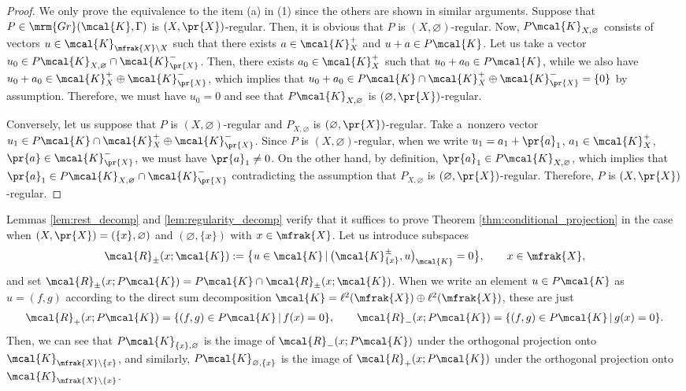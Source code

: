 \begin{proof}
We only prove the equivalence to the item (a) in (1) since the others are shown in similar arguments.
Suppose that $P\in \mrm{Gr}(\mcal{K},\Gamma)$ is $(X,\pr{X})$-regular. Then, it is obvious that $P$ is $(X,\varnothing)$-regular. Now, $P\mcal{K}_{X,\varnothing}$ consists of vectors $u\in\mcal{K}_{\mfrak{X}\backslash X}$ such that there exists $a\in \mcal{K}_{X}^{+}$ and $u+a\in P\mcal{K}$. Let us take a vector $u_{0}\in P\mcal{K}_{X,\varnothing}\cap \mcal{K}_{\pr{X}}^{-}$. Then, there exists $a_{0}\in \mcal{K}_{X}^{+}$ such that $u_{0}+a_{0}\in P\mcal{K}$, while we also have $u_{0}+a_{0}\in \mcal{K}_{X}^{+}\oplus \mcal{K}_{\pr{X}}^{-}$, which implies that $u_{0}+a_{0}\in P\mcal{K}\cap \mcal{K}_{X}^{+}\oplus \mcal{K}_{\pr{X}}^{-}=\{0\}$ by assumption. Therefore, we must have $u_{0}=0$ and see that $P\mcal{K}_{X,\varnothing}$ is $(\varnothing,\pr{X})$-regular.

Conversely, let us suppose that $P$ is $(X,\varnothing)$-regular and $P_{X,\varnothing}$ is $(\varnothing,\pr{X})$-regular. Take a~nonzero vector $u_{1}\in P\mcal{K}\cap \mcal{K}_{X}^{+}\oplus \mcal{K}_{\pr{X}}^{-}$. Since $P$ is $(X,\varnothing)$-regular, when we write $u_{1}=a_{1}+\pr{a}_{1}$, $a_{1}\in \mcal{K}_{X}^{+}$, $\pr{a}\in \mcal{K}_{\pr{X}}^{-}$, we must have $\pr{a}_{1}\neq 0$. On the other hand, by definition, $\pr{a}_{1}\in P\mcal{K}_{X,\varnothing}$, which implies that $\pr{a}_{1}\in P\mcal{K}_{X,\varnothing}\cap \mcal{K}_{\pr{X}}^{-}$ contradicting the assumption that $P_{X,\varnothing}$ is $(\varnothing,\pr{X})$-regular. Therefore, $P$ is $(X,\pr{X})$-regular.
\end{proof}

Lemmas \ref{lem:rest_decomp} and \ref{lem:regularity_decomp} verify that it suffices to prove Theorem \ref{thm:conditional_projection} in the case when $(X,\pr{X})=(\{x\},\varnothing)$ and $(\varnothing,\{x\})$ with $x\in\mfrak{X}$.
Let us introduce subspaces
\begin{gather*}
	\mcal{R}_{\pm}(x;\mcal{K}):=\big\{u\in \mcal{K}\,|\, \big(\mcal{K}^{\pm}_{\{x\}},u\big)_{\mcal{K}}=0\big\},\qquad x\in \mfrak{X},
\end{gather*}
and set $\mcal{R}_{\pm}(x;P\mcal{K})=P\mcal{K}\cap \mcal{R}_{\pm}(x;\mcal{K})$.
When we write an element $u\in P\mcal{K}$ as $u=(f,g)$ according to the direct sum decomposition $\mcal{K}=\ell^{2}(\mfrak{X})\oplus \ell^{2}(\mfrak{X})$, these are just
\begin{gather*}
	\mcal{R}_{+}(x;P\mcal{K}) =\{(f,g)\in P\mcal{K}\,|\,f(x)=0\}, \qquad \mcal{R}_{-}(x;P\mcal{K}) =\{(f,g)\in P\mcal{K}\,|\,g(x)=0\}.
\end{gather*}
Then, we can see that $P\mcal{K}_{\{x\},\varnothing}$ is the image of $\mcal{R}_{-}(x;P\mcal{K})$ under the orthogonal projection onto~$\mcal{K}_{\mfrak{X}\backslash\{x\}}$, and similarly, $P\mcal{K}_{\varnothing,\{x\}}$ is the image of $\mcal{R}_{+}(x;P\mcal{K})$ under the orthogonal projection onto~$\mcal{K}_{\mfrak{X}\backslash\{x\}}$.

